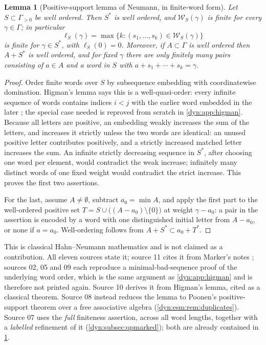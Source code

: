 \documentclass[11pt,letterpaper]{article}
\newtheorem{lemma}[lemma]{Lemma}
\theoremstyle{definition}
\theoremstyle{remark}
\newcommand{\word}{\mathcal W}
\numberwithin{equation}{section}
\begin{document}
\begin{lemma}[Positive-support lemma of Neumann, in finite-word form]
\label{dyn:lem:neumann}
Let $S\subset\Gamma_{>0}$ be well ordered. Then $S^{*}$ is well ordered,
and $\word_S(\gamma)$ is finite for every $\gamma\in\Gamma$; in particular
\begin{equation}\label{dyn:eq:depth}
 \ell_S(\gamma)=\max\{k:(s_1,\dots,s_k)\in\word_S(\gamma)\}
\end{equation}
is finite for $\gamma\in S^{*}$, with $\ell_S(0)=0$. Moreover, if
$A\subset\Gamma$ is well ordered then $A+S^{*}$ is well ordered, and for
fixed $\gamma$ there are only finitely many pairs consisting of $a\in A$
and a word in $S$ with $a+s_1+\cdots+s_k=\gamma$.
\end{lemma}
\begin{proof}
Order finite words over $S$ by subsequence embedding with coordinatewise
domination. Higman's lemma says this is a well-quasi-order: every infinite
sequence of words contains indices $i<j$ with the earlier word embedded in
the later \cite{Higman}; the special case needed is reproved from scratch
in \cref{dyn:app:higman}. Because all letters are positive, an embedding
weakly increases the sum of the letters, and increases it strictly unless
the two words are identical: an unused positive letter contributes
positively, and a strictly increased matched letter increases the sum.
An infinite strictly decreasing sequence in $S^{*}$, after choosing one
word per element, would contradict the weak increase; infinitely many
distinct words of one fixed weight would contradict the strict increase.
This proves the first two assertions.

For the last, assume $A\ne\emptyset$, subtract $a_0=\min A$, and apply the
first part to the well-ordered positive set
$T=S\cup\bigl((A-a_0)\setminus\{0\}\bigr)$ at weight $\gamma-a_0$: a pair
in the assertion is encoded by a word with one distinguished initial letter
from $A-a_0$, or none if $a=a_0$. Well-ordering follows from
$A+S^{*}\subset a_0+T^{*}$.
\end{proof}

This is classical Hahn--Neumann mathematics \cite{Neumann,Poonen} and is not
claimed as a contribution. All eleven sources state it; source 11 cites
it from Marker's notes \cite[Lemma~2.36]{Marker}; sources 02, 05 and 09
each reproduce a minimal-bad-sequence proof of the underlying word order,
which is the same argument as \cref{dyn:app:higman} and is therefore not
printed again. Source 10 derives it from Higman's lemma, cited as a
classical theorem. Source 08 instead reduces the lemma to Poonen's
positive-support theorem over a free associative algebra
(\cref{dyn:esm:rem:duplicates}). Source 07 uses the \emph{full} finiteness assertion, across
all word lengths, together with a \emph{labelled} refinement of it
(\cref{dyn:subsec:qpmarked}); both are already contained in
\cref{dyn:lem:neumann}.
\end{document}
